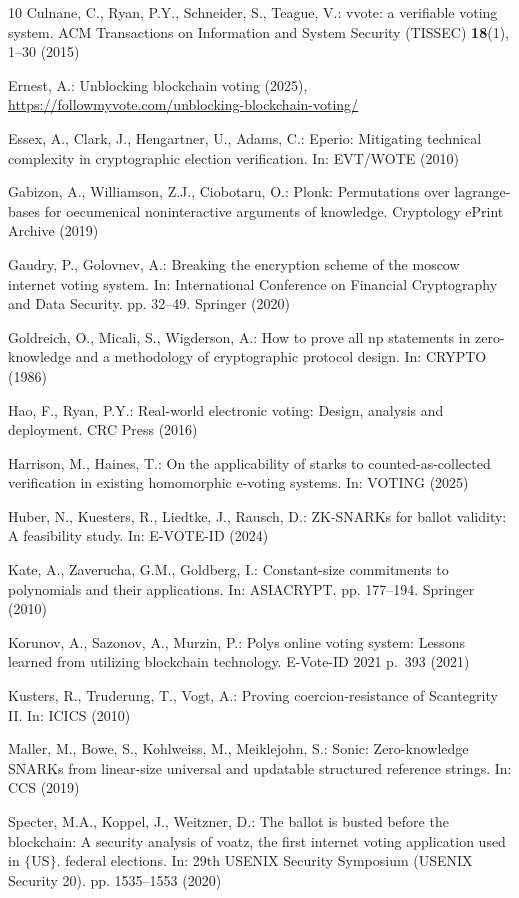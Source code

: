 \documentclass[runningheads]{llncs}
\begin{document}
\begin{thebibliography}{10}
Culnane, C., Ryan, P.Y., Schneider, S., Teague, V.: vvote: a verifiable voting
  system. ACM Transactions on Information and System Security (TISSEC)
  \textbf{18}(1),  1--30 (2015)

Ernest, A.: Unblocking blockchain voting (2025),
  \url{https://followmyvote.com/unblocking-blockchain-voting/}

Essex, A., Clark, J., Hengartner, U., Adams, C.: Eperio: Mitigating technical
  complexity in cryptographic election verification. In: EVT/WOTE (2010)

Gabizon, A., Williamson, Z.J., Ciobotaru, O.: Plonk: Permutations over
  lagrange-bases for oecumenical noninteractive arguments of knowledge.
  Cryptology ePrint Archive  (2019)

Gaudry, P., Golovnev, A.: Breaking the encryption scheme of the moscow internet
  voting system. In: International Conference on Financial Cryptography and
  Data Security. pp. 32--49. Springer (2020)

Goldreich, O., Micali, S., Wigderson, A.: How to prove all np statements in
  zero-knowledge and a methodology of cryptographic protocol design. In: CRYPTO
  (1986)

Hao, F., Ryan, P.Y.: Real-world electronic voting: Design, analysis and
  deployment. CRC Press (2016)

Harrison, M., Haines, T.: On the applicability of starks to
  counted-as-collected verification in existing homomorphic e-voting systems.
  In: VOTING (2025)

Huber, N., Kuesters, R., Liedtke, J., Rausch, D.: {ZK}-{SNARKs} for ballot
  validity: A feasibility study. In: E-VOTE-ID (2024)

Kate, A., Zaverucha, G.M., Goldberg, I.: Constant-size commitments to
  polynomials and their applications. In: ASIACRYPT. pp. 177--194. Springer
  (2010)

Korunov, A., Sazonov, A., Murzin, P.: Polys online voting system: Lessons
  learned from utilizing blockchain technology. E-Vote-ID 2021 p.~393 (2021)

Kusters, R., Truderung, T., Vogt, A.: Proving coercion-resistance of
  {Scantegrity II}. In: ICICS (2010)

Maller, M., Bowe, S., Kohlweiss, M., Meiklejohn, S.: Sonic: Zero-knowledge
  {SNARKs} from linear-size universal and updatable structured reference
  strings. In: CCS (2019)

Specter, M.A., Koppel, J., Weitzner, D.: The ballot is busted before the
  blockchain: A security analysis of voatz, the first internet voting
  application used in $\{$US$\}$. federal elections. In: 29th USENIX Security
  Symposium (USENIX Security 20). pp. 1535--1553 (2020)

\end{thebibliography}
\end{document}
